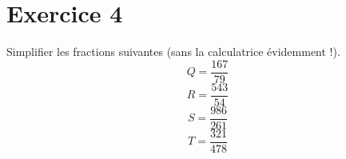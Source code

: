 \documentclass[10pt,a4paper]{article}
\begin{document}
\section{Exercice 4}
Simplifier les fractions suivantes (sans la calculatrice évidemment !).
\begin{equation}
Q=\frac{167}{79}
\end{equation}
\begin{equation}
R=\frac{543}{54}
\end{equation}
\begin{equation}
S=\frac{986}{261}
\end{equation}
\begin{equation}
T=\frac{321}{478}
\end{equation}
\end{document}
